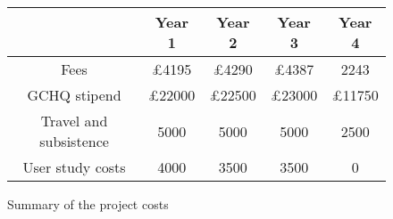 \documentclass[10pt]{article}
\begin{document}
\begin{figure}[h!t]
\begin{center}
\begin{tabular}{|c|c|c|c|c|}
\hline 
& {\bf Year 1} &{\bf Year 2}&{\bf Year 3}&{\bf Year 4}\\
\hline
Fees & £4195 & £4290 & £4387 & 2243 \\
\hline
GCHQ stipend & £22000 & £22500 & £23000 & £11750 \\
\hline
Travel and subsistence & 5000 & 5000 & 5000 & 2500 \\
\hline
User study costs & 4000 & 3500 & 3500 & 0 \\
\hline
\end{tabular}
\end{center}
\caption{Summary of the project costs}
\label{fig:costs}
\end{figure}

%
%
%
%
\small


\end{document}
